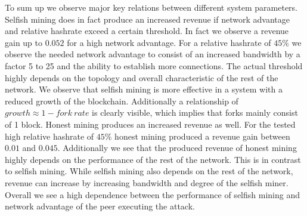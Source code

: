 To sum up we observe major key relations between different system parameters. Selfish mining does in fact produce an increased revenue if network advantage and relative hashrate exceed a certain threshold. In fact we observe a revenue gain up to $0.052$ for a high network advantage. For a relative hashrate of $45\% $ we observe the needed network advantage to consist of an increased bandwidth by a factor 5 to 25 and the ability to establish more connections. The actual threshold highly depends on the topology and overall characteristic of the rest of the network. We observe that selfish mining is more effective in a system with a reduced growth of the blockchain. Additionally a relationship of $growth \approx 1-fork~rate$ is clearly visible, which implies that forks mainly consist of 1 block. Honest mining produces an increased revenue as well. For the tested high relative hashrate of $45\% $ honest mining produced a revenue gain between $0.01$ and $0.045$. Additionally we see that the produced revenue of honest mining highly depends on the performance of the rest of the network. This is in contrast to selfish mining. While selfish mining also depends on the rest of the network, revenue can increase by increasing bandwidth and degree of the selfish miner. Overall we see a high dependence between the performance of selfish mining and network advantage of the peer executing the attack.









 
